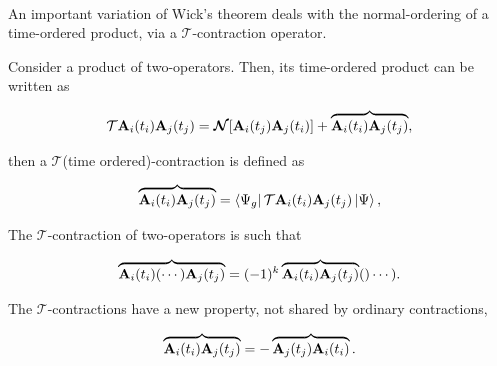 \documentclass{homework}
\begin{document}
\blanky \\
An important variation of Wick's theorem deals with the normal-ordering of a time-ordered product, via a $\bm{\mathcal{T}}$-contraction operator. 

\begin{theorem}

Consider a product of two-operators. Then, its time-ordered product can be written as 

\begin{equation}
    \mathcal{T} {{\bf A}}_{i}(t_i) {{\bf A}}_{j}(t_j) = \bm{\mathcal{N}}[{{\bf A}}_{i}(t_j) {{\bf A}}_{j}(t_i)] + \overbrace{{{\bf A}}_{i}(t_i) {{\bf A}}_{j}(t_j)}, 
\end{equation}

then a $\bm{\mathcal{T}}$(time ordered)-contraction is defined as 

\begin{equation}
    \overbrace{{{\bf A}}_{i}(t_i) {{\bf A}}_{j}(t_j)} = \bra{\Psi_g} \mathcal{T} {{\bf A}}_{i}(t_i) {{\bf A}}_{j}(t_j) \ket{\Psi},
\end{equation}

\end{theorem}

\begin{remark}
    The $\bm{\mathcal{T}}$-contraction of two-operators is such that 
    
    \begin{equation}
        \overbrace{{{\bf A}}_{i}(t_i) (\cdots ) {{\bf A}}_{j}(t_j)} = (-1)^k \overbrace{{{\bf A}}_{i}(t_i) {{\bf A}}_{j}(t_j)} ()\cdots).
    \end{equation}
\end{remark}

\begin{remark}
    The $\bm{\mathcal{T}}$-contractions have a new property, not shared by ordinary contractions,
    
    \begin{equation}
        \overbrace{{{\bf A}}_{i}(t_i) {{\bf A}}_{j}(t_j)} = - \overbrace{{{\bf A}}_{j}(t_j) {{\bf A}}_{i}(t_i)}.
    \end{equation}
\end{remark}
\end{document}
